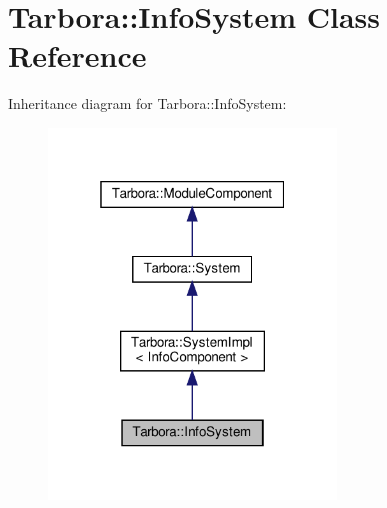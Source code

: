 \hypertarget{classTarbora_1_1InfoSystem}{}\section{Tarbora\+:\+:Info\+System Class Reference}
\label{classTarbora_1_1InfoSystem}


Inheritance diagram for Tarbora\+:\+:Info\+System\+:
\nopagebreak
\begin{figure}[H]
\begin{center}
\leavevmode
\includegraphics[width=217pt]{classTarbora_1_1InfoSystem__inherit__graph}
\end{center}
\end{figure}


